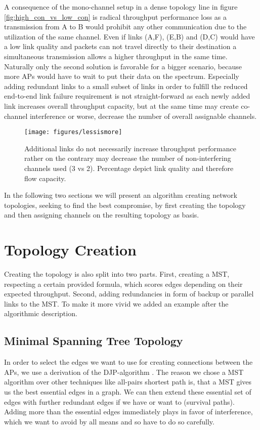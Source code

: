   A consequence of the mono-channel setup in a dense topology line in figure \ref{fig:high_con_vs_low_con} is radical throughput performance loss as a transmission from
  A to B would prohibit any other communication due to the utilization of the same channel. Even if links (A,F), (E,B) and (D,C) would have a low link quality and packets
  can not travel directly to their destination a simultaneous transmission allows a higher throughput in the same time. Naturally only the second solution is favorable for a
  bigger scenario, because more APs would have to wait to put their data on the spectrum.
  Especially adding redundant links to a small subset of links in order to fulfill the reduced end-to-end link failure requirement is not straight-forward as each newly
  added link increases overall throughput capacity, but at the same time may create co-channel interference or worse, decrease the number of overall assignable channels.
  
  \begin{figure}[h!]
    \centering
      \texttt{[image: figures/lessismore]}
      \caption{Additional links do not necessarily increase throughput performance rather on the contrary may decrease the number of non-interfering channels used (3 vs 2).
	Percentage depict link quality and therefore flow capacity.}
    \label{fig:lessismore}
  \end{figure}
  
  In the following two sections we will present an algorithm creating network topologies, seeking to find the best compromise, by first creating the topology and then
  assigning channels on the resulting topology as basis.
 
  \section{Topology Creation}
    Creating the topology is also split into two parts.
    First, creating a \ac{MST}, respecting a certain provided formula, which scores edges depending on their expected throughput.
    Second, adding redundancies in form of backup or parallel links to the \ac{MST}. 
    To make it more vivid we added an example after the algorithmic description.

    \subsection{Minimal Spanning Tree Topology}
      In order to select the edges we want to use for creating connections between the APs, we use a derivation of the \ac{DJP}-algorithm \cite{prim}\cite{jarnik}.
      The reason we chose a \ac{MST} algorithm over other techniques like all-pairs shortest path is, that a \ac{MST} gives us the best essential edges in a graph. 
      We can then extend these essential set of edges with further redundant edges if we have or want to (survival paths). 
      Adding more than the essential edges immediately plays in favor of interference, which we want to avoid by all means and so have to do so carefully.
      
